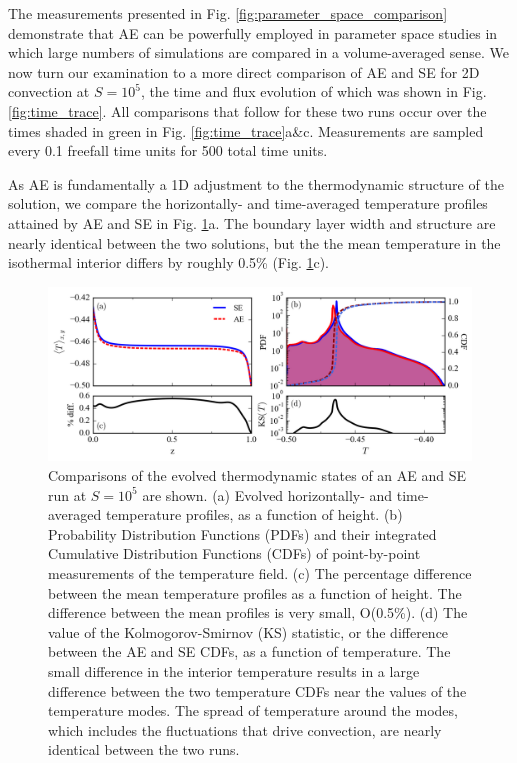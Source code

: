 \documentclass[aps, pre, onecolumn, nofootinbib, notitlepage, groupedaddress, amsfonts, amssymb, amsmath, longbibliography]{revtex4-1}
\begin{document}
The measurements presented in Fig. \ref{fig:parameter_space_comparison} demonstrate
that AE can be powerfully employed in parameter space studies in which
large numbers of simulations are compared in a volume-averaged sense.  We now turn
our examination to a more direct comparison of AE and SE for 2D convection at
$S = 10^5$, the time and flux evolution of which was shown in Fig. \ref{fig:time_trace}.
All comparisons that follow for these two runs occur over the times shaded in
green in Fig. \ref{fig:time_trace}a\&c. Measurements are sampled every
0.1 freefall time units for 500 total time units.

As AE is fundamentally a 1D adjustment to the thermodynamic structure of the
solution, we compare the horizontally- and time-averaged temperature profiles 
attained by AE and SE in Fig. \ref{fig:temp_comparison}a.  
The boundary layer width and structure are  
nearly identical between the two solutions, but the
the mean temperature in the isothermal interior differs by roughly 0.5\%
(Fig. \ref{fig:temp_comparison}c). 

\begin{figure}[t]
\includegraphics[width=\textwidth]{./figs/temp_comparison.png}
\caption{Comparisons of the evolved thermodynamic states of an AE and SE run
at $S = 10^{5}$ are shown.  (a) Evolved horizontally- and time-averaged 
temperature profiles, as a function of height.
(b) Probability Distribution Functions (PDFs) and their integrated
Cumulative Distribution Functions (CDFs)
of point-by-point measurements of the temperature field.
(c) The percentage difference between the mean temperature profiles as a function of height.
The difference between the mean profiles is very small, O(0.5\%).
(d) The value of the Kolmogorov-Smirnov (KS) statistic, or the difference between
the AE and SE CDFs, as a function of temperature.
The small
difference in the interior temperature 
results in a large difference between the two temperature CDFs near the values
of the temperature modes.  The spread of temperature around the modes, which includes the 
fluctuations that drive convection, are nearly identical between the two runs.
\label{fig:temp_comparison} }
\end{figure}
\end{document}
